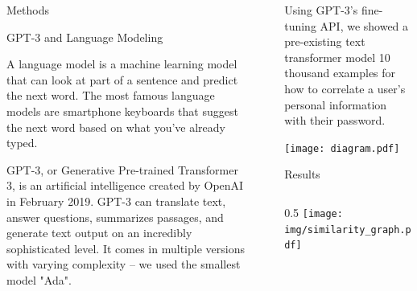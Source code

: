 \documentclass[final]{beamer}
\newlength{\sepwidth}
\newlength{\colwidth}
\newcommand{\separatorcolumn}{\begin{column}{\sepwidth}\end{column}}
\begin{document}
\begin{frame}[t]
\begin{columns}[t]
\begin{column}{\colwidth}
\begin{block}{Methods}
  \begin{alertblock}{GPT-3 and Language Modeling}

     A language model is a machine learning model that can look at part of a sentence and predict the next word. The most famous language models are smartphone keyboards that suggest the next word based on what you've already typed.

    GPT-3, or Generative Pre-trained Transformer 3, is an artificial intelligence created by OpenAI in February 2019. GPT-3 can translate text, answer questions, summarizes passages, and generate text output on an incredibly sophisticated level. It comes in multiple versions with varying complexity – we used the smallest model "Ada".

  \end{alertblock}

  \end{block}

\end{column}

\separatorcolumn

\begin{column}{\colwidth}
    
    Using GPT-3's fine-tuning API, we showed a pre-existing text transformer model 10 thousand examples for how to correlate a user's personal information with their password.
    
    \vspace{12mm}
    
    \texttt{[image: diagram.pdf]}

    \vspace{12mm}

  \begin{block}{Results}
    
    \vspace{12mm}
    
    \begin{columns}
    \begin{column}{0.5\colwidth}
       \texttt{[image: img/similarity\_graph.pdf]}
    \end{column}
    

\end{columns}
\end{block}
\end{column}
\end{columns}
\end{frame}
\end{document}
